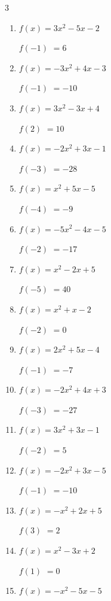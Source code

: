 \begin{multicols}{3}
\begin{enumerate}
$f(-2)$
        $= -1$

\columnbreak %

  \item $f(x)=3x^{2}-5x-2$

$f(-1)$
        $= 6$

  \item $f(x)=-3x^{2}+4x-3$

$f(-1)$
        $= -10$

  \item $f(x)=3x^{2}-3x+4$

$f(2)$
        $= 10$

  \item $f(x)=-2x^{2}+3x-1$

$f(-3)$
        $= -28$

  \item $f(x)=x^{2}+5x-5$

$f(-4)$
        $= -9$

  \item $f(x)=-5x^{2}-4x-5$

$f(-2)$
        $= -17$

  \item $f(x)=x^{2}-2x+5$

$f(-5)$
        $= 40$

  \item $f(x)=x^{2}+x-2$

$f(-2)$
        $= 0$

  \item $f(x)=2x^{2}+5x-4$

$f(-1)$
        $= -7$

  \item $f(x)=-2x^{2}+4x+3$

$f(-3)$
        $= -27$

  \item $f(x)=3x^{2}+3x-1$

$f(-2)$
        $= 5$

  \item $f(x)=-2x^{2}+3x-5$

$f(-1)$
        $= -10$

  \item $f(x)=-x^{2}+2x+5$

$f(3)$
        $= 2$

  \item $f(x)=x^{2}-3x+2$

$f(1)$
        $= 0$

  \item $f(x)=-x^{2}-5x-5$


\end{enumerate}
\end{multicols}
